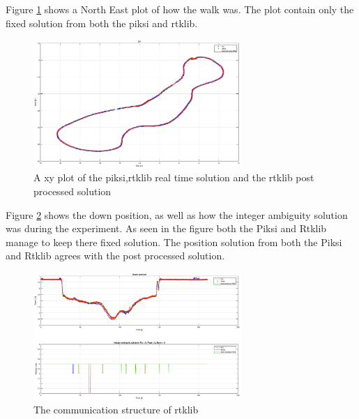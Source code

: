 Figure \ref{figure:xywalk1} shows a North East plot of how the walk was. The plot contain only the fixed solution from both the piksi and rtklib. 
\begin{figure}[H]
	\centering
		\includegraphics[width=0.7\textwidth]{figs/plots/xywalk1.eps}
		\caption{A xy plot of the piksi,rtklib real time solution and the rtklib post processed solution}
		\label{figure:xywalk1}
\end{figure}
Figure \ref{figure:DownAndAmbwalk1} shows the down position, as well as how the integer ambiguity solution was during the experiment. As seen in the figure both the Piksi and Rtklib manage to keep there fixed solution. The position solution from both the Piksi and Rtklib agrees with the post processed solution. 
\begin{figure}[H]
	\centering
		\includegraphics[width=0.7\textwidth]{figs/plots/downWalk1.eps}
		\caption{The communication structure of rtklib}
		\label{figure:DownAndAmbwalk1}
\end{figure}

